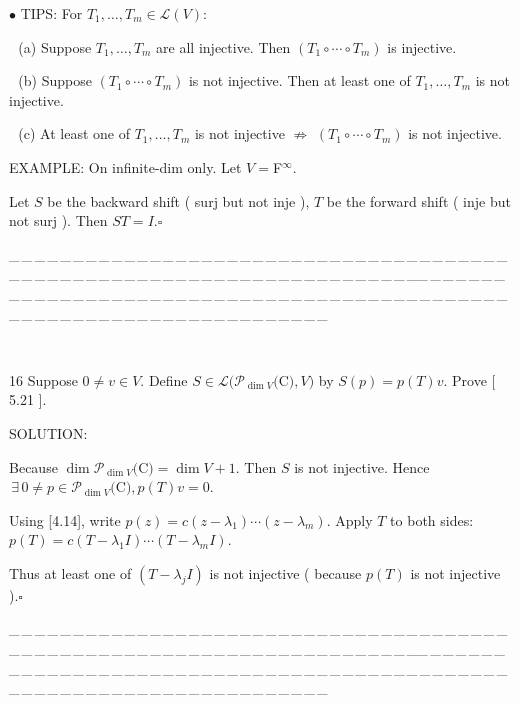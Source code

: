 \documentclass[a4paper, 11pt, UTF8]{article}
\def\Lm{\mathcal{L}}
\def\Po{\mathcal{P}}
\begin{document}
\begin{large}
{\small $\bullet$} {\timesbf\Large T{\normalsize IPS}:} {\timessl For $T_1,\dots,T_m\in\Lm(V)$}:\par\,\,
(a) Suppose $T_1,\dots,T_m$ are all injective. Then $(T_1\circ\cdots\circ T_m)$ is injective.{\small\par}\,\,
(b) Suppose $(T_1\circ\cdots\circ T_m)$ is not injective. Then at least one of $T_1,\dots,T_m$ is not injective.{\small\par}\,\,
(c) At least one of $T_1,\dots,T_m$ is not injective $\not\Rightarrow$ $(T_1\circ\cdots\circ T_m)$ is not injective.\normalsize{\small\par}\qquad
E{\small XAMPLE}: On infinite-dim only. Let $V=${\timesbf F}$^\infty.${\small\par}\qquad
Let $S$ be the backward shift ( surj but not inje ), $T$ be the forward shift ( inje but not surj ). Then $ST=I$.\quad$\square${\small\par}
{\tiny \_\,\_\,\_\,\_\,\_\,\_\,\_\,\_\,\_\,\_\,\_\,\_\,\_\,\_\,\_\,\_\,\_\,\_\,\_\,\_\,\_\,\_\,\_\,\_\,\_\,\_\,\_\,\_\,\_\,\_\,\_\,\_\,\_\,\_\,\_\,\_\,\_\,\_\,\_\,\_\,\_\,\_\,\_\,\_\,\_\,\_\,\_\,\_\,\_\,\_\,\_\,\_\,\_\,\_\,\_\,\_\,\_\,\_\,\_\,\_\,\_\,\_\,\_\,\_\,\_\,\_\,\_\,\_\,\_\,\_\,\_\_\,\_\,\_\,\_\,\_\,\_\,\_\,\_\,\_\,\_\,\_\,\_\,\_\,\_\,\_\,\_\,\_\,\_\,\_\,\_\,\_\,\_\,\_\,\_\,\_\,\_\,\_\,\_\,\_\,\_\,\_\,\_\,\_\,\_\,\_\,\_\,\_\,\_\,\_\,\_\,\_\,\_\,\_\,\_\,\_\,\_\,\_\,\_\,\_\,\_\,\_\,\_\,\_\,\_\,\_\,\_\,\_\,\_\,\_\,\_\,\_\,\_\,\_\,\_\,\_\,\_\,\_\,\_\,\_\,\_\,\_}{\tiny\,\par}
\large
{\timesbf\Large 16} {\timessl\Large 
Suppose $0\neq v\in V.$ Define $S\in\Lm(\Po_{\dim V}(${\timesbf C}$),V)$ by $S(p)=p(T)v.$ Prove $[$ 5.21 $].$
}\par
{\timesbf S\footnotesize{OLUTION:}}\par\quad
Because $\dim\Po_{\dim V}(${\timesbf C}$)=\dim V+1.$ Then $S$ is not injective. Hence $\,\exists\,0\neq p\in\Po_{\dim V}(${\timesbf C}$),p(T)v=0.$\par\quad
Using [4.14], write $p(z)=c(z-\lambda_1)\cdots(z-\lambda_m).$ Apply $T$ to both sides: $p(T)=c(T-\lambda_1 I)\cdots(T-\lambda_m I).$\par\quad
Thus at least one of $(T-\lambda_j I)$ is not injective ( because $p(T)$ is not injective ).\quad$\square$\par
{\tiny \_\,\_\,\_\,\_\,\_\,\_\,\_\,\_\,\_\,\_\,\_\,\_\,\_\,\_\,\_\,\_\,\_\,\_\,\_\,\_\,\_\,\_\,\_\,\_\,\_\,\_\,\_\,\_\,\_\,\_\,\_\,\_\,\_\,\_\,\_\,\_\,\_\,\_\,\_\,\_\,\_\,\_\,\_\,\_\,\_\,\_\,\_\,\_\,\_\,\_\,\_\,\_\,\_\,\_\,\_\,\_\,\_\,\_\,\_\,\_\,\_\,\_\,\_\,\_\,\_\,\_\,\_\,\_\,\_\,\_\,\_\_\,\_\,\_\,\_\,\_\,\_\,\_\,\_\,\_\,\_\,\_\,\_\,\_\,\_\,\_\,\_\,\_\,\_\,\_\,\_\,\_\,\_\,\_\,\_\,\_\,\_\,\_\,\_\,\_\,\_\,\_\,\_\,\_\,\_\,\_\,\_\,\_\,\_\,\_\,\_\,\_\,\_\,\_\,\_\,\_\,\_\,\_\,\_\,\_\,\_\,\_\,\_\,\_\,\_\,\_\,\_\,\_\,\_\,\_\,\_\,\_\,\_\,\_\,\_\,\_\,\_\,\_\,\_\,\_\,\_\,\_}\par


\end{large}
\end{document}
